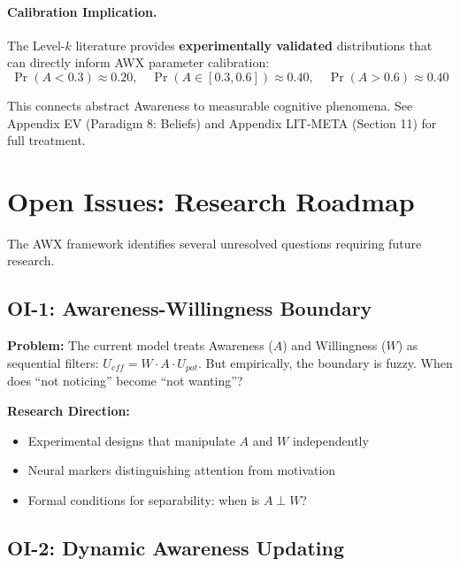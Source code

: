 \paragraph{Calibration Implication.}
The Level-$k$ literature provides \textbf{experimentally validated} distributions that can
directly inform AWX parameter calibration:
\begin{equation}
\Pr(A < 0.3) \approx 0.20, \quad \Pr(A \in [0.3, 0.6]) \approx 0.40, \quad \Pr(A > 0.6) \approx 0.40
\tag{AU-LK}
\end{equation}

This connects abstract Awareness to measurable cognitive phenomena.
See Appendix EV (Paradigm 8: Beliefs) and Appendix LIT-META (Section 11) for full treatment.



\section{Open Issues: Research Roadmap}
\label{sec:open-issues}

The AWX framework identifies several unresolved questions requiring future research.

\subsection{OI-1: Awareness-Willingness Boundary}

\textbf{Problem:} The current model treats Awareness ($A$) and Willingness ($W$) as sequential filters: $U_{eff} = W \cdot A \cdot U_{pot}$. But empirically, the boundary is fuzzy. When does ``not noticing'' become ``not wanting''?

\textbf{Research Direction:}
\begin{itemize}[nosep]
    \item Experimental designs that manipulate $A$ and $W$ independently
    \item Neural markers distinguishing attention from motivation
    \item Formal conditions for separability: when is $A \perp W$?
\end{itemize}

\subsection{OI-2: Dynamic Awareness Updating}

